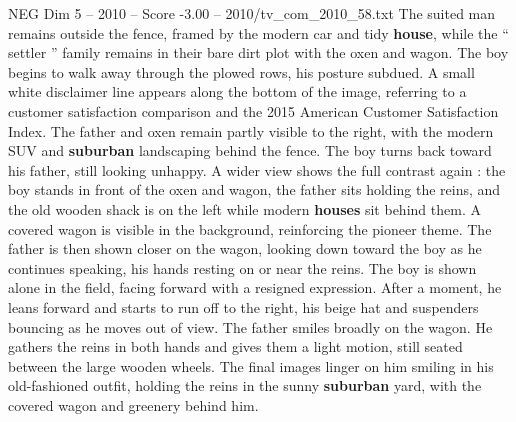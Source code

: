 \begin{textsample}{NEG Dim 5 – 2010 – Score -3.00 – 2010/tv\_com\_2010\_58.txt}
The suited man remains outside the fence, framed by the modern car and tidy \textbf{house}, while the “ settler ” family remains in their bare dirt plot with the oxen and wagon.
The boy begins to walk away through the plowed rows, his posture subdued.
A small white disclaimer line appears along the bottom of the image, referring to a customer satisfaction comparison and the 2015 American Customer Satisfaction Index.
The father and oxen remain partly visible to the right, with the modern SUV and \textbf{suburban} landscaping behind the fence.
The boy turns back toward his father, still looking unhappy.
A wider view shows the full contrast again : the boy stands in front of the oxen and wagon, the father sits holding the reins, and the old wooden shack is on the left while modern \textbf{houses} sit behind them.
A covered wagon is visible in the background, reinforcing the pioneer theme.
The father is then shown closer on the wagon, looking down toward the boy as he continues speaking, his hands resting on or near the reins.
The boy is shown alone in the field, facing forward with a resigned expression.
After a moment, he leans forward and starts to run off to the right, his beige hat and suspenders bouncing as he moves out of view.
The father smiles broadly on the wagon.
He gathers the reins in both hands and gives them a light motion, still seated between the large wooden wheels.
The final images linger on him smiling in his old-fashioned outfit, holding the reins in the sunny \textbf{suburban} yard, with the covered wagon and greenery behind him.

\end{textsample}
